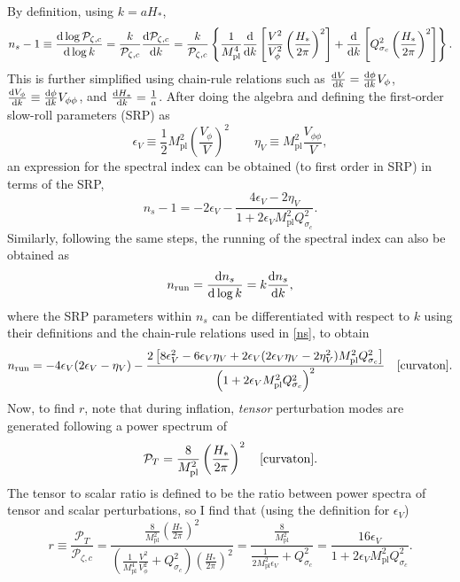 \documentclass[12pt]{article}
\newcommand*\diff{\mathop{}\!\mathrm{d}}
\newcommand{\pc}{\mathcal{P}_{\zeta,c}}
\begin{document}
By definition, using $k=aH_*$,
\begin{equation}\label{ns}
    n_s-1\equiv\frac{\diff \log \pc}{\diff\log k}=\frac{k}{\pc}\dv{\pc}{k}=\frac{k}{\pc}\left\{\frac{1}{M_\text{pl}^4}\dv{}{k}\left[\frac{V^2}{V^2_\phi}\left(\frac{H_*}{2\pi}\right)^2\right]+\dv{}{k}\left[Q_{\sigma_c}^2\left(\frac{H_*}{2\pi}\right)^2\right]\right\}.
\end{equation}
This is further simplified using chain-rule relations such as $\dv{V}{k}=\dv{\phi}{k}V_\phi$, $\dv{V_\phi}{k}\equiv\dv{\phi}{k}V_{\phi\phi}$, and $\dv{H_*}{k}=\frac{1}{a}$. After doing the algebra and defining the first-order slow-roll parameters (SRP) as
\begin{equation}
    \epsilon_V\equiv\frac{1}{2}M^2_\text{pl}\left(\frac{V_\phi}{V}\right)^2\qquad \eta_V\equiv M^2_\text{pl}\frac{V_{\phi\phi}}{V},
\end{equation}
an expression for the spectral index can be obtained \cite{curvaton} (to first order in SRP) in terms of the SRP, 
\begin{equation}
    n_s-1=-2\epsilon_V-\frac{4\epsilon_V-2\eta_V}{1+2\epsilon_VM^2_\text{pl}Q_{\sigma_c}^2}.
\end{equation}
Similarly, following the same steps, the running of the spectral index can also be obtained as
\begin{equation}
    n_\text{run}=\dv{n_s}{\log k}=k\dv{n_s}{k},
\end{equation}
where the SRP parameters within $n_s$ can be differentiated with respect to $k$ using their definitions and the chain-rule relations used in \eqref{ns}, to obtain
\begin{equation}
    n_\text{run}=-4\epsilon_V(2\epsilon_V-\eta_V)-\frac{2\left[8\epsilon_V^2-6\epsilon_V\eta_V+2\epsilon_V(2\epsilon_V\eta_V-2\eta_V^2)M^2_\text{pl}Q_{\sigma_c}^2\right]}{\left(1+2\epsilon_VM^2_\text{pl}Q_{\sigma_c}^2\right)^2}\quad\text{\cite{curvaton}}.
\end{equation}
Now, to find $r$, note that during inflation, \textit{tensor} perturbation modes are generated following a power spectrum of
\begin{equation}
    \mathcal{P}_T=\frac{8}{M^2_\text{pl}}\left(\frac{H_*}{2\pi}\right)^2 \quad \text{\cite{curvaton}}.
\end{equation}
The tensor to scalar ratio is defined to be the ratio between power spectra of tensor and scalar perturbations, so I find that (using the definition for $\epsilon_V$)
\begin{equation}
    r\equiv\frac{\mathcal{P}_T}{\pc}=\frac{\frac{8}{M^2_\text{pl}}\left(\frac{H_*}{2\pi}\right)^2}{\left(\frac{1}{M_\text{pl}^4}\frac{V^2}{V^2_\phi}+Q_{\sigma_c}^2\right)\left(\frac{H_*}{2\pi}\right)^2}=\frac{\frac{8}{M^2_\text{pl}}}{\frac{1}{2M_\text{pl}^2\epsilon_V}+Q_{\sigma_c}^2}=\frac{16\epsilon_V}{1+2\epsilon_VM^2_\text{pl}Q_{\sigma_c}^2}.
\end{equation}
\end{document}
